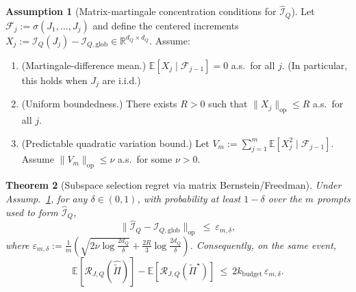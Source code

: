 \documentclass{article}
\theoremstyle{plain}
\newtheorem{theorem}{Theorem}[section]
\theoremstyle{definition}
\newtheorem{assumption}[theorem]{Assumption}
\theoremstyle{remark}
\begin{document}
\begin{assumption}[Matrix-martingale concentration conditions for $\widehat{\mathcal I}_Q$]
\label{assump:IQ_freedman_app}
Let $\mathcal F_j:=\sigma(J_1,\dots,J_j)$ and define the centered increments $X_j:=\mathcal I_Q(J_j)-\mathcal I_{Q,\mathrm{glob}} \in \mathbb R^{d_Q\times d_Q}$.
Assume:
\begin{enumerate}[label=\textbf{(A\arabic*)}, leftmargin=*, itemsep=0pt, parsep=0pt, topsep=0pt, partopsep=0pt, before=\vspace{-0.4\baselineskip}]
\item ({Martingale-difference mean.})
$\mathbb E[X_j\mid \mathcal F_{j-1}]=0$ a.s.\ for all $j$.
(In particular, this holds when $J_j$ are i.i.d.)
\item ({Uniform boundedness.})
There exists $R>0$ such that $\|X_j\|_{\mathrm{op}}\le R$ a.s.\ for all $j$.
\item ({Predictable quadratic variation bound.})
Let
$
V_m:=\sum_{j=1}^m \mathbb E[X_j^2\mid \mathcal F_{j-1}].
$
Assume $\|V_m\|_{\mathrm{op}}\le \nu$ a.s.\ for some $\nu>0$.
\end{enumerate}
\end{assumption}


\begin{theorem}[Subspace selection regret via matrix Bernstein/Freedman]
\label{thm:subspace_regret_app}
Under Assump.~\ref{assump:IQ_freedman_app}, for any $\delta\in(0,1)$,
with probability at least $1-\delta$ over the $m$ prompts used to form $\widehat{\mathcal I}_Q$,
\begin{equation}
\label{eq:app_IQ_conc_eps}
\bigl\|\widehat{\mathcal I}_Q-\mathcal I_{Q,\mathrm{glob}}\bigr\|_{\mathrm{op}}
\ \le\
\varepsilon_{m,\delta},
\end{equation}
where $\varepsilon_{m,\delta} :=
\frac{1}{m}(
\sqrt{2\nu\log\frac{2d_Q}{\delta}}
+
\frac{2R}{3}\log\frac{2d_Q}{\delta}
)$.
Consequently, on the same event,
\begin{equation}
\label{eq:app_regret_highprob}
\mathbb{E}[\mathcal R_{J,Q}(\widehat{\widetilde\Pi})]
-
\mathbb{E}[\mathcal R_{J,Q}(\widetilde\Pi^\star)]
\ \le\
2k_{\text{budget}}\,
\varepsilon_{m,\delta}.
\end{equation}
\end{theorem}
\end{document}
